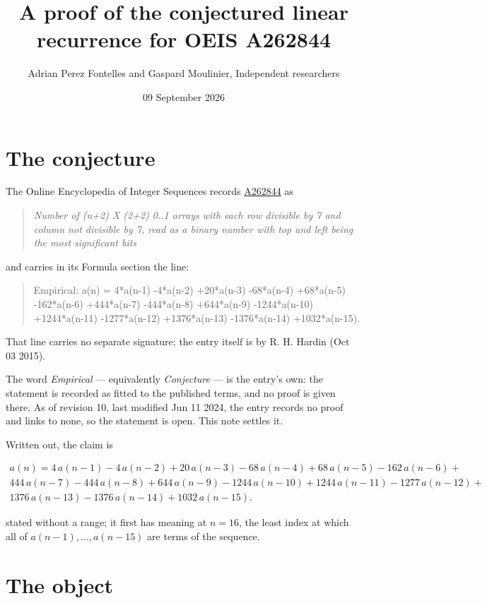 \documentclass[11pt]{article}
\title{A proof of the conjectured linear recurrence for OEIS A262844}
\author{Adrian Perez Fontelles and Gaspard Moulinier, Independent researchers}
\date{09 September 2026}
\theoremstyle{definition}
\begin{document}
\maketitle
\section{The conjecture}

The Online Encyclopedia of Integer Sequences records \href{https://oeis.org/A262844}{A262844} as

\begin{quote}\itshape Number of (n+2) X (2+2) 0..1 arrays with each row divisible by 7 and column not divisible by 7, read as a binary number with top and left being the most significant bits\end{quote}

and carries in its Formula section the line:

\begin{quote}\ttfamily Empirical: a(n) = 4*a(n-1) -4*a(n-2) +20*a(n-3) -68*a(n-4) +68*a(n-5) -162*a(n-6) +444*a(n-7) -444*a(n-8) +644*a(n-9) -1244*a(n-10) +1244*a(n-11) -1277*a(n-12) +1376*a(n-13) -1376*a(n-14) +1032*a(n-15).\end{quote}

That line carries no separate signature; the entry itself is by R. H. Hardin (Oct 03 2015).

The word {\itshape Empirical} --- equivalently {\itshape Conjecture} --- is the entry's own: the statement is recorded as fitted to the published terms, and no proof is given there. As of revision 10, last modified Jun 11 2024, the entry records no proof and links to none, so the statement is open. This note settles it.

Written out, the claim is

\begin{multline*} a(n) = 4\,a(n-1) - 4\,a(n-2) + 20\,a(n-3) - 68\,a(n-4) + 68\,a(n-5) - 162\,a(n-6) + \\ 444\,a(n-7) - 444\,a(n-8) + 644\,a(n-9) - 1244\,a(n-10) + 1244\,a(n-11) - 1277\,a(n-12) + \\ 1376\,a(n-13) - 1376\,a(n-14) + 1032\,a(n-15). \end{multline*}

stated without a range; it first has meaning at $n = 16$, the least index at which all of $a(n-1),\dots,a(n-15)$ are terms of the sequence.

\section{The object}
\end{document}
